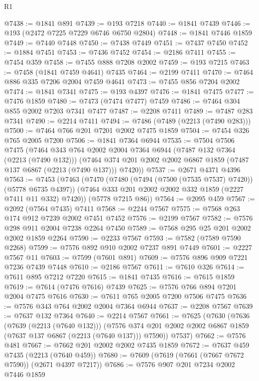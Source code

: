 \begin{lexlean}{R1}
\begin{coremodule}
@7438 := @1841 @891
@7439 := @193 @7218
@7440 := @1841 @7439
@7446 := @193 (@2472 @7225 @7229 @6746 @6750 @2804)
@7448 := @1841 @7446 @1859
@7449 := @7440 @7448
@7450 := @7438 @7449
@7451 := @7437 @7450
@7452 := @1884 @7451
@7453 := @7436 @7452
@7454 := @2186 @7411
@7455 := @7454 @359
@7458 := @7455 @888 @7208 @2002
@7459 := @193 @7215
@7463 := @7458 (@1841 @7459 @4641) @7435
@7464 := @2199 @7411
@7470 := @7464 @886 @335 @7206 @2004 @7459 @4641
@7473 := @7455 @856 @7204 @2002
@7474 := @1841 @7341
@7475 := @193 @4397
@7476 := @1841 @7475
@7477 := @7476 @1859
@7480 := @7473 (@7474 @7477) @7459
@7486 := @7464 @304 @855 @2002 @7203 @7341 @7477
@7487 := @2208 @7411
@7489 := @7487 @283 @7341
@7490 := @2214 @7411
@7494 := @7486 (@7489 (@2213 (@7490 @283)))
@7500 := @7464 @766 @201 @7201 @2002 @7475 @1859
@7504 := @7454 @326 @765 @2005 @7200
@7506 := @1841 @7364 @6944
@7535 := @7504
    @7506
    @7475
    (@7464
      @343
      @764
      @2002
      @2004
      @7364
      @6944
      (@7487 @132 @7364 (@2213 (@7490 @132)))
      (@7464 @374 @201 @2002 @2002 @6867 @1859 (@7487 @137 @6867 (@2213 (@7490 @137))) @7420))
@7537 := @2671 @4371 @4396
@7563 := @7453
    (@7463
      (@7470
        (@7480 (@7494 (@7500 (@7535 @7537) @7420)) (@5778 @6735 @4397))
        (@7464 @333 @201 @2002 @2002 @332 @1859 (@2227 @7411 @11 @332) @7420))
      (@5778 @7215 @86))
@7564 := @2095 @459
@7567 := @2092 (@7564 @7435) @7411
@7568 := @2244 @7567
@7575 := @7568 @263 @174 @912 @7239 @2002 @7451 @7452
@7576 := @2199 @7567
@7582 := @7576 @298 @911 @2004 @7238 @2264 @7450
@7589 := @7568 @295 @25 @201 @2002 @2002 @1859 @2264
@7590 := @2233 @7567
@7593 := @7582 (@7589 @7590 @2268)
@7599 := @7576 @892 @910 @2002 @7237 @891 @7449
@7601 := @2227 @7567 @11
@7603 := @7599 (@7601 @891)
@7609 := @7576 @896 @909 @7221 @7236 @7439 @7448
@7610 := @2186 @7567
@7611 := @7610 @326
@7614 := @7611 @895 @7212 @7220
@7615 := @1841 @7435
@7616 := @7615 @1859
@7619 := @7614 (@7476 @7616) @7439
@7625 := @7576 @766 @894 @7201 @2004 @7475 @7616
@7630 := @7611 @765 @2005 @7200 @7506 @7475
@7636 := @7576 @343 @764 @2002 @2004 @7364 @6944
@7637 := @2208 @7567
@7639 := @7637 @132 @7364
@7640 := @2214 @7567
@7661 := @7625
    (@7630
      (@7636
        (@7639 (@2213 (@7640 @132)))
        (@7576 @374 @201 @2002 @2002 @6867 @1859 (@7637 @137 @6867 (@2213 (@7640 @137))) @7590))
      @7537)
@7662 := @7576 @481
@7667 := @7662 @201 @2002 @2002 @7435 @1859
@7672 := @7637 @459 @7435 (@2213 (@7640 @459))
@7680 := @7609 (@7619 (@7661 (@7667 @7672 @7590)) (@2671 @4397 @7217))
@7686 := @7576 @907 @201 @7234 @2002 @7446 @1859

\end{coremodule}
\end{lexlean}
